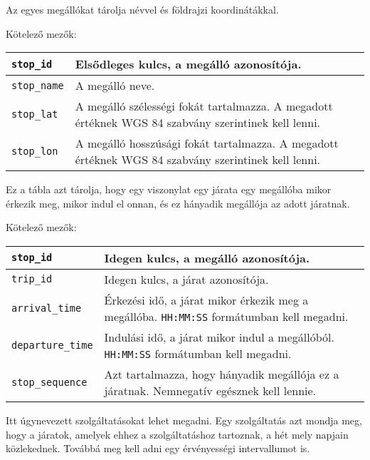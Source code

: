 
Az egyes megállókat tárolja névvel és földrajzi koordinátákkal.

\medskip

\noindent Kötelező mezők:

\bigskip

\begin{tabular}{|p{3cm}|p{10cm}|}
\hline
\texttt{stop\_id} & Elsődleges kulcs, a megálló azonosítója. \\
\hline
\texttt{stop\_name} & A megálló neve. \\
\hline
\texttt{stop\_lat} & A megálló szélességi fokát tartalmazza. A megadott értéknek WGS 84 szabvány szerintinek kell lenni. \\
\hline
\texttt{stop\_lon} & A megálló hosszúsági fokát tartalmazza. A megadott értéknek WGS 84 szabvány szerintinek kell lenni. \\
\hline
\end{tabular}


Ez a tábla azt tárolja, hogy egy viszonylat egy járata egy megállóba mikor érkezik meg, mikor indul el onnan, és ez hányadik megállója az adott járatnak.

\medskip

\noindent Kötelező mezők:

\bigskip

\begin{tabular}{|p{3.5cm}|p{9.5cm}|}
\hline
\texttt{stop\_id} & Idegen kulcs, a megálló azonosítója. \\
\hline
\texttt{trip\_id} & Idegen kulcs, a járat azonosítója. \\
\hline
\texttt{arrival\_time} & Érkezési idő, a járat mikor érkezik meg a megállóba. \texttt{HH:MM:SS} formátumban kell megadni. \\
\hline
\texttt{departure\_time} & Indulási idő, a járat mikor indul a megállóból. \texttt{HH:MM:SS} formátumban kell megadni. \\
\hline
\texttt{stop\_sequence} & Azt tartalmazza, hogy hányadik megállója ez a járatnak. Nemnegatív egésznek kell lennie. \\
\hline
\end{tabular}


Itt úgynevezett szolgáltatásokat lehet megadni. Egy szolgáltatás azt mondja meg, hogy a járatok, amelyek ehhez a szolgáltatáshoz tartoznak, a hét mely napjain közlekednek. Továbbá meg kell adni egy érvényességi intervallumot is.

